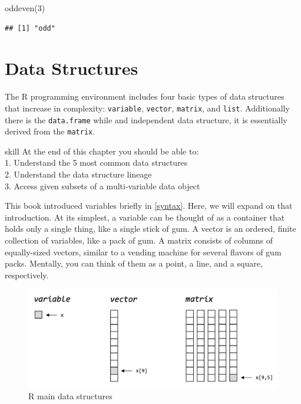 \documentclass[
]{book}
\newenvironment{Shaded}{\begin{snugshade}}{\end{snugshade}}
\newcommand{\DecValTok}[1]{\textcolor[rgb]{0.00,0.00,0.81}{#1}}
\newcommand{\FunctionTok}[1]{\textcolor[rgb]{0.00,0.00,0.00}{#1}}
\newcommand{\NormalTok}[1]{#1}
\begin{document}
\begin{Shaded}
\begin{Highlighting}[]
\FunctionTok{oddeven}\NormalTok{(}\DecValTok{3}\NormalTok{)}
\end{Highlighting}
\end{Shaded}

\begin{verbatim}
## [1] "odd"
\end{verbatim}

\hypertarget{data-structures}{%
\chapter{Data Structures}\label{data-structures}}

The R programming environment includes four basic types of data structures that increase in complexity: \texttt{variable}, \texttt{vector}, \texttt{matrix}, and \texttt{list}. Additionally there is the \texttt{data.frame} while and independent data structure, it is essentially derived from the \texttt{matrix}.

\begin{infobox}{skill}
At the end of this chapter you should be able to:\\
1. Understand the 5 most common data structures\\
2. Understand the data structure lineage\\
3. Access given subsets of a multi-variable data object\\


\end{infobox}

\hfill\break
This book introduced variables briefly in \ref{syntax}. Here, we will expand on that introduction. At its simplest, a variable can be thought of as a container that holds only a single thing, like a single stick of gum. A vector is an ordered, finite collection of variables, like a pack of gum. A matrix consists of columns of equally-sized vectors, similar to a vending machine for several flavors of gum packs. Mentally, you can think of them as a point, a line, and a square, respectively.

\begin{figure}

{\centering \includegraphics[width=0.67\linewidth]{images/04_001_data_structures} 

}

\caption{\label{fig:4001}R main data structures}\label{fig:4001}
\end{figure}
\end{document}
